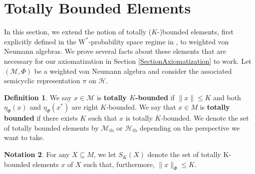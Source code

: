 \documentclass[12pt]{amsart}
\newtheorem{thm}{Theorem}[section]
\theoremstyle{definition}
\newtheorem{defn}[thm]{Definition}
\newtheorem{notation}[thm]{Notation}
\def\cal{\mathcal}
\newcommand{\wstar}{$\mathrm{W}^*$}
\def \tb{\operatorname{tb}}
\begin{document}


\section{Totally Bounded Elements}\label{SectionTotallyBounded}

In this section, we extend the notion of totally ($K$-)bounded elements, first explicitly defined in the \wstar-probability space regime in \cite{AGHS}, to weighted von Neumann algebras.  We prove several facts about these elements that are necessary for our axiomatization in Section \ref{SectionAxiomatization} to work.  Let $(\cal M, \Phi)$ be a weighted von Neumann algebra and consider the associated semicyclic representation $\pi$ on $\cal H$.

\begin{defn}
     We say $x \in \cal M$ is \textbf{totally $K$-bounded} if $\| x \| \leq K$ and both $\eta_{\Phi}(x)$ and $\eta_{\Phi}(x^*)$ are right $K$-bounded.  We say that $x \in M$ is \textbf{totally bounded} if there exists $K$ such that $x$ is totally $K$-bounded.  We  denote the set of totally bounded elements by $\cal M_{\tb}$ or $\cal H_{\tb}$ depending on the perspective we want to take.
\end{defn}

\begin{notation}
    For any $X \subseteq M$, we let $S_{K}(X)$ denote the set of totally K-bounded elements $x$ of $X$ such that, furthermore, $\|x\|_{\Phi} \leq K$.
\end{notation}
\end{document}
